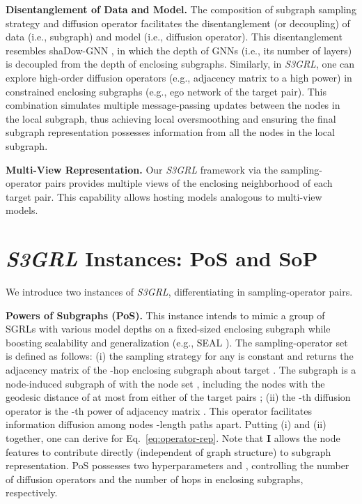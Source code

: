 \documentclass[sigconf, nonacm]{acmart}
\newcommand{\pos}{{P\lowercase{o}S}\xspace}
\newcommand{\sop}{{S\lowercase{o}P}\xspace}
\newcommand{\ssgrl}{\textit{S3GRL}\xspace}
\begin{document}
\vskip 1mm
\noindent \textbf{Disentanglement of Data and Model.} The composition of subgraph sampling strategy  and diffusion operator  facilitates the disentanglement (or decoupling) of data (i.e., subgraph) and model (i.e., diffusion operator). This disentanglement resembles shaDow-GNN \cite{zeng2021decoupling}, in which the depth of GNNs (i.e., its number of layers) is decoupled from the depth of enclosing subgraphs. Similarly, in \ssgrl, one can explore high-order diffusion operators (e.g., adjacency matrix to a high power) in constrained enclosing subgraphs (e.g., ego network of the target pair). This combination simulates multiple message-passing updates between the nodes in the local subgraph, thus achieving local oversmoothing  \cite{zeng2021decoupling} and ensuring the final subgraph representation possesses information from all the nodes in the local subgraph.

\vskip 1mm
\noindent \textbf{Multi-View Representation.} Our \ssgrl framework via the sampling-operator pairs provides multiple views of the enclosing neighborhood of each target pair. This capability allows hosting models analogous to multi-view \cite{abu2020n,Cai_Ji_2020} models.


\section{\ssgrl Instances: \pos and \sop}
We introduce two instances of \ssgrl, differentiating in sampling-operator pairs. 




\vskip 1mm
\noindent \textbf{Powers of Subgraphs (\pos).} This instance intends to mimic a group of SGRLs with various model depths on a fixed-sized enclosing subgraph while boosting scalability and generalization (e.g., SEAL \cite{zhang2018link}). The sampling-operator set  is defined as follows: (i) the sampling strategy  for any  is constant and returns the adjacency matrix  of the -hop enclosing subgraph  about target . The subgraph  is a node-induced subgraph of  with the node set , including the nodes with the geodesic distance of at most  from either of the target pairs \cite{zhang2018link}; (ii) the -th diffusion operator  is the -th power of adjacency matrix . This operator facilitates information diffusion among nodes -length paths apart. Putting (i) and (ii) together, one can derive  for Eq.~\ref{eq:operator-rep}.  Note that  \textbf{I} allows the node features to contribute directly (independent of graph structure) to subgraph representation. \pos possesses two hyperparameters  and , controlling the number of diffusion operators and the number of hops in enclosing subgraphs, respectively. 
\end{document}
